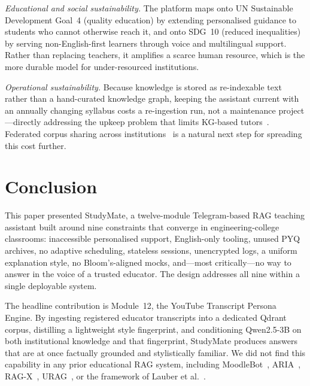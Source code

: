\documentclass[conference]{IEEEtran}
\begin{document}
\textit{Educational and social sustainability.} The platform maps onto
UN Sustainable Development Goal~4 (quality education) by extending
personalised guidance to students who cannot otherwise reach it, and
onto SDG~10 (reduced inequalities) by serving non-English-first
learners through voice and multilingual support. Rather than replacing
teachers, it amplifies a scarce human resource, which is the more
durable model for under-resourced institutions.

\textit{Operational sustainability.} Because knowledge is stored as
re-indexable text rather than a hand-curated knowledge graph, keeping
the assistant current with an annually changing syllabus costs a
re-ingestion run, not a maintenance project---directly addressing the
upkeep problem that limits KG-based tutors~\cite{dong2025}. Federated
corpus sharing across institutions~\cite{fajardo2025} is a natural next
step for spreading this cost further.
\section{Conclusion}
This paper presented StudyMate, a twelve-module Telegram-based RAG
teaching assistant built around nine constraints that converge in
engineering-college classrooms: inaccessible personalised support,
English-only tooling, unused PYQ archives, no adaptive scheduling,
stateless sessions, unencrypted logs, a uniform explanation style, no
Bloom's-aligned mocks, and---most critically---no way to answer in the
voice of a trusted educator. The design addresses all nine within a
single deployable system.

The headline contribution is Module~12, the YouTube Transcript Persona
Engine. By ingesting registered educator transcripts into a dedicated
Qdrant corpus, distilling a lightweight style fingerprint, and
conditioning Qwen2.5-3B on both institutional knowledge and that
fingerprint, StudyMate produces answers that are at once factually
grounded and stylistically familiar. We did not find this capability in
any prior educational RAG system, including
MoodleBot~\cite{neumann2025}, ARIA~\cite{luo2026}, RAG-X~\cite{he2025},
URAG~\cite{nguyen2025}, or the framework of Lauber et al.~\cite{lauber2025}.
\end{document}
